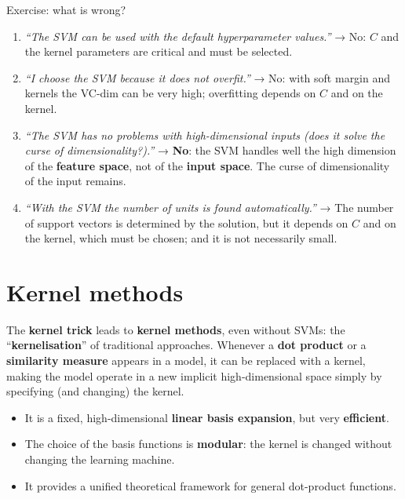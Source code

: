 \begin{boxquestion}{Exercise: what is wrong?}

\begin{enumerate}
\def\labelenumi{\arabic{enumi}.}
\tightlist
\item
  \emph{``The SVM can be used with the default hyperparameter
  values.''} → No: \(C\) and the kernel parameters are critical and must
  be selected.
\item
  \emph{``I choose the SVM because it does not overfit.''} → No: with
  soft margin and kernels the VC-dim can be very high; overfitting
  depends on \(C\) and on the kernel.
\item
  \emph{``The SVM has no problems with high-dimensional inputs (does
  it solve the curse of dimensionality?).''} → \textbf{No}: the SVM
  handles well the high dimension of the \textbf{feature space}, not of
  the \textbf{input space}. The curse of dimensionality of the input
  remains.
\item
  \emph{``With the SVM the number of units is found automatically.''}
  → The number of support vectors is determined by the solution, but it
  depends on \(C\) and on the kernel, which must be chosen; and it is
  not necessarily small.
\end{enumerate}

\end{boxquestion}

\section{Kernel methods}\label{metodi-kernel}

The \textbf{kernel trick} leads to \textbf{kernel methods}, even
without SVMs: the ``\textbf{kernelisation}'' of traditional approaches.
Whenever a \textbf{dot product} or a \textbf{similarity measure}
appears in a model, it can be replaced with a kernel, making the model
operate in a new implicit high-dimensional space simply by specifying
(and changing) the kernel.

\begin{itemize}
\tightlist
\item
  It is a fixed, high-dimensional \textbf{linear basis expansion}, but
  very \textbf{efficient}.
\item
  The choice of the basis functions is \textbf{modular}: the kernel is
  changed without changing the learning machine.
\item
  It provides a unified theoretical framework for general dot-product
  functions.
\end{itemize}

